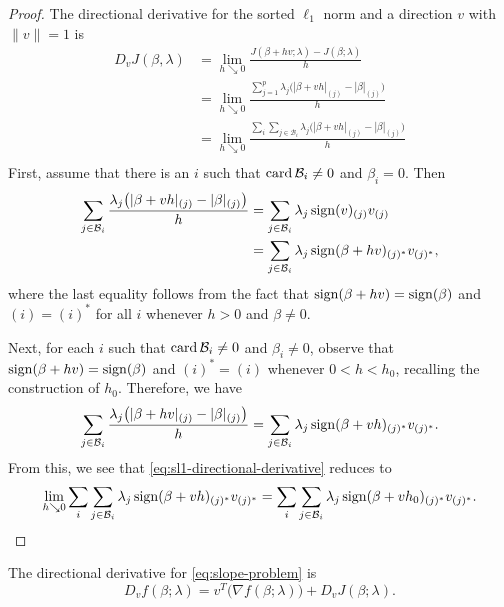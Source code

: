 \begin{proof}
  The directional derivative for the sorted \(\ell_1\) norm and a direction
  \(v\) with \(\lVert v \rVert = 1\) is
  \begin{equation}
    \label{eq:sl1-directional-derivative}
    \begin{aligned}
      D_v J(\beta, \lambda) & = \lim_{h \searrow 0} \frac{J(\beta + h v; \lambda) - J(\beta; \lambda)}{h}                                            \\
                            & = \lim_{h \searrow 0} \frac{\sum_{j=1}^p\lambda_j\big(|\beta + vh|_{(j)} - |\beta|_{(j)}\big)}{h}                      \\
                            & = \lim_{h \searrow 0}\frac{\sum_i \sum_{j \in \mathcal{B}_i} \lambda_j\big(|\beta + vh|_{(j)} - |\beta|_{(j)}\big)}{h} \\
    \end{aligned}
  \end{equation}
  First, assume that there is an \(i\) such that \(\operatorname{card} \mathcal{B}_i \neq 0\)
  and \(\beta_i = 0\).
  Then
  \[
    \begin{aligned}
      \sum_{j \in \mathcal{B}_i}\frac{\lambda_j \big( |\beta + vh|_{(j)} - |\beta|_{(j)}\big)}{h}
       & = \sum_{j \in \mathcal{B}_i} \lambda_j \operatorname{sign}(v)_{(j)}v_{(j)}               \\
       & = \sum_{j \in \mathcal{B}_i} \lambda_j \operatorname{sign}(\beta + hv)_{(j)^*}v_{(j)^*},
    \end{aligned}
  \]
  where the last equality follows from the fact that \(\operatorname{sign}(\beta + hv) =
  \operatorname{sign}(\beta)\) and \((i) = (i)^*\) for all \(i\) whenever \(h > 0\) and
  \(\beta \neq 0\).

  Next, for each \(i\) such that \(\operatorname{card} \mathcal{B}_i \neq 0\) and
  \(\beta_i \neq 0\), observe that \(\operatorname{sign}(\beta + hv) = \operatorname{sign}(\beta)\) and
  \((i)^* = (i)\) whenever \(0 < h < h_0\), recalling the construction
  of \(h_0\).
  Therefore, we have
  \[
    \sum_{j \in \mathcal{B}_i} \frac{\lambda_j\big(|\beta + hv|_{(j)} - |\beta|_{(j)}\big)}{h}
    = \sum_{j \in \mathcal{B}_i} \lambda_j\operatorname{sign}(\beta + vh)_{(j)^*}v_{(j)^*}.
  \]
  From this, we see that \eqref{eq:sl1-directional-derivative} reduces to
  \[
    \lim_{h \searrow 0} \sum_i \sum_{j \in \mathcal{B}_i} \lambda_j\operatorname{sign}(\beta + vh)_{(j)^*}v_{(j)^*}
    = \sum_i \sum_{j \in \mathcal{B}_i} \lambda_j\operatorname{sign}(\beta + vh_0)_{(j)^*}v_{(j)^*}.
  \]
\end{proof}

\begin{remark}
  The directional derivative for \eqref{eq:slope-problem} is
  \[
    D_v f(\beta; \lambda) = v^T \big(\nabla f(\beta; \lambda)\big) + D_v J(\beta; \lambda).
  \]
\end{remark}

